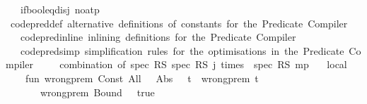 \begin{isabellebody}
\ \ \ if{\isacharunderscore}{\kern0pt}bool{\isacharunderscore}{\kern0pt}eq{\isacharunderscore}{\kern0pt}disj\ {\isacharbrackleft}{\kern0pt}no{\isacharunderscore}{\kern0pt}atp{\isacharbrackright}{\kern0pt}%
\isadelimdocument
%
\endisadelimdocument
%
\isatagdocument
%
\isamarkuptrue%
%
\endisatagdocument
{\isafolddocument}%
%
\isadelimdocument
%
\endisadelimdocument
{}\isamarkupfalse%
\ code{\isacharunderscore}{\kern0pt}pred{\isacharunderscore}{\kern0pt}def\ {\isachardoublequoteopen}alternative\ definitions\ of\ constants\ for\ the\ Predicate\ Compiler{\isachardoublequoteclose}\isanewline
\ \ \ code{\isacharunderscore}{\kern0pt}pred{\isacharunderscore}{\kern0pt}inline\ {\isachardoublequoteopen}inlining\ definitions\ for\ the\ Predicate\ Compiler{\isachardoublequoteclose}\isanewline
\ \ \ code{\isacharunderscore}{\kern0pt}pred{\isacharunderscore}{\kern0pt}simp\ {\isachardoublequoteopen}simplification\ rules\ for\ the\ optimisations\ in\ the\ Predicate\ Compiler{\isachardoublequoteclose}%
\isadelimdocument
%
\endisadelimdocument
%
\isatagdocument
%
\isamarkuptrue%
%
\endisatagdocument
{\isafolddocument}%
%
\isadelimdocument
%
\endisadelimdocument
%
\isadelimML
%
\endisadelimML
%
\isatagML
{}\isamarkupfalse%
\ {\isacartoucheopen}\isanewline
\ \ {\isacharparenleft}{\kern0pt}{\isacharasterisk}{\kern0pt}\ combination\ of\ {\isacharparenleft}{\kern0pt}spec\ RS\ spec\ RS\ {\isachardot}{\kern0pt}{\isachardot}{\kern0pt}{\isachardot}{\kern0pt}{\isacharparenleft}{\kern0pt}j\ times{\isacharparenright}{\kern0pt}\ {\isachardot}{\kern0pt}{\isachardot}{\kern0pt}{\isachardot}{\kern0pt}\ spec\ RS\ mp{\isacharparenright}{\kern0pt}\ {\isacharasterisk}{\kern0pt}{\isacharparenright}{\kern0pt}\isanewline
\ \ local\isanewline
\ \ \ \ fun\ wrong{\isacharunderscore}{\kern0pt}prem\ {\isacharparenleft}{\kern0pt}Const\ {\isacharparenleft}{\kern0pt}\isactrlconstUNDERSCOREname {\isasymopen}All{\isasymclose}{\isacharcomma}{\kern0pt}\ {\isacharunderscore}{\kern0pt}{\isacharparenright}{\kern0pt}\ {\isachardollar}{\kern0pt}\ Abs\ {\isacharparenleft}{\kern0pt}{\isacharunderscore}{\kern0pt}{\isacharcomma}{\kern0pt}\ {\isacharunderscore}{\kern0pt}{\isacharcomma}{\kern0pt}\ t{\isacharparenright}{\kern0pt}{\isacharparenright}{\kern0pt}\ {\isacharequal}{\kern0pt}\ wrong{\isacharunderscore}{\kern0pt}prem\ t\isanewline
\ \ \ \ \ \ {\isacharbar}{\kern0pt}\ wrong{\isacharunderscore}{\kern0pt}prem\ {\isacharparenleft}{\kern0pt}Bound\ {\isacharunderscore}{\kern0pt}{\isacharparenright}{\kern0pt}\ {\isacharequal}{\kern0pt}\ true\isanewline

\end{isabellebody}

